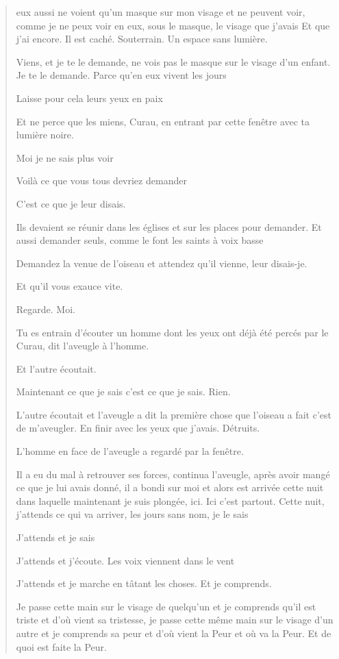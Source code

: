 \begin{quote}
eux aussi ne voient qu'un masque sur mon visage et ne peuvent voir,
comme je ne peux voir en eux, sous le masque, le visage que j'avais Et
que j'ai encore. Il est caché. Souterrain. Un espace sans lumière.

Viens, et je te le demande, ne vois pas le masque sur le visage d'un
enfant. Je te le demande. Parce qu'en eux vivent les jours

Laisse pour cela leurs yeux en paix

Et ne perce que les miens, Curau, en entrant par cette fenêtre avec ta
lumière noire.

Moi je ne sais plus voir

Voilà ce que vous tous devriez demander

C'est ce que je leur disais.

Ils devaient se réunir dans les églises et sur les places pour demander.
Et aussi demander seuls, comme le font les saints à voix basse

Demandez la venue de l'oiseau et attendez qu'il vienne, leur disais-je.

Et qu'il vous exauce vite.

Regarde. Moi.

Tu es entrain d'écouter un homme dont les yeux ont déjà été percés par
le Curau, dit l'aveugle à l'homme.

Et l'autre écoutait.

Maintenant ce que je sais c'est ce que je sais. Rien.

L'autre écoutait et l'aveugle a dit la première chose que l'oiseau a
fait c'est de m'aveugler. En finir avec les yeux que j'avais. Détruits.

L'homme en face de l'aveugle a regardé par la fenêtre.

Il a eu du mal à retrouver ses forces, continua l'aveugle, après avoir
mangé ce que je lui avais donné, il a bondi sur moi et alors est arrivée
cette nuit dans laquelle maintenant je suis plongée, ici. Ici c'est
partout. Cette nuit, j'attends ce qui va arriver, les jours sans nom, je
le sais

J'attends et je sais

J'attends et j'écoute. Les voix viennent dans le vent

J'attends et je marche en tâtant les choses. Et je comprends.

Je passe cette main sur le visage de quelqu'un et je comprends qu'il est
triste et d'où vient sa tristesse, je passe cette même main sur le
visage d'un autre et je comprends sa peur et d'où vient la Peur et où va
la Peur. Et de quoi est faite la Peur.


\end{quote}
